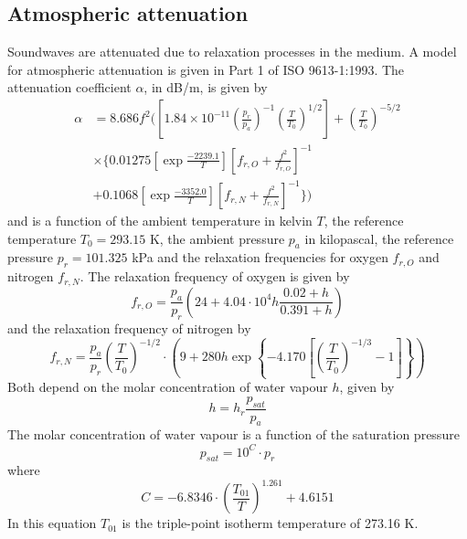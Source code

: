 \subsection{Atmospheric attenuation}\label{sec:theory_sound_atmospheric_attenuation}
Soundwaves are attenuated due to relaxation processes in the medium.
A model for atmospheric attenuation is given in Part 1 of ISO 9613-1:1993\cite{ISO9613-1}.
The attenuation coefficient $\alpha$, in dB/m, is given by
\begin{align}\label{eq:theory:sound:atmospheric-attenuation}
 \alpha &= 8.686 f^2 \Biggl( \left[ 1.84 \times 10^{-11} \left(\frac{p_r}{p_a}\right)^{-1} \left(\frac{T}{T_0}\right)^{1/2} \right] + \left(\frac{T}{T_0}\right)^{-5/2} \nonumber \\ 
 &\times \Biggl\{ 0.01275 \left[ \exp{\frac{-2239.1}{T}} \right]  \left[f_{r,O} + \frac{f^2}{f_{r,O}} \right]^{-1} \nonumber \\
 &+ 0.1068 \left[ \exp{\frac{-3352.0}{T}} \right] \left[ f_{r,N} + \frac{f^2}{f_{r,N}} \right]^{-1} \Biggr\} \Biggr) 
\end{align}
and is a function of the ambient temperature in kelvin $T$, the reference
temperature $T_0=293.15$ K, the ambient pressure $p_a$ in kilopascal, the
reference pressure $p_r=101.325$ kPa and the relaxation frequencies for oxygen 
$f_{r,O}$ and nitrogen $f_{r,N}$.
The relaxation frequency of oxygen is given by
\begin{equation}
 f_{r,O} = \frac{p_a}{p_r} \left( 24 + 4.04 \cdot 10^4 h \frac{0.02 + h}{0.391 + h}  \right)
\end{equation}
and the relaxation frequency of nitrogen by
\begin{equation}
 f_{r,N} = \frac{p_a}{p_r} \left( \frac{T}{T_0} \right)^{-1/2} \cdot \left( 9 + 280 h \exp{\left\{ -4.170 \left[ \left(\frac{T}{T_0} \right)^{-1/3} -1 \right] \right\} } \right)
\end{equation}
Both depend on the molar concentration of water vapour $h$, given by
\begin{equation}
 h = h_r  \frac{p_{sat}}{p_a}
\end{equation}
The molar concentration of water vapour is a function of the saturation pressure
\begin{equation}
 p_{sat} = 10^C \cdot p_r
\end{equation}
where 
\begin{equation}
 C = -6.8346 \cdot \left( \frac{T_{01}}{T} \right)^{1.261}  + 4.6151
\end{equation}
In this equation $T_{01}$ is the triple-point isotherm temperature of 273.16 K.

